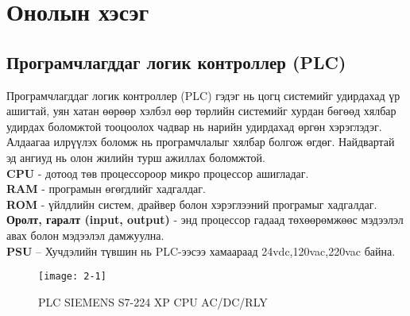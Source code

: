 
\chapter{Онолын хэсэг} %

\label{Chapter2} %
\pagecolor{white}
\section{Програмчлагддаг логик контроллер (PLC)}
Програмчлагддаг логик контроллер (PLC) гэдэг нь цогц системийг удирдахад үр ашигтай, уян хатан өөрөөр хэлбэл өөр төрлийн системийг хурдан бөгөөд хялбар удирдах боломжтой тооцоолох чадвар нь нарийн удирдахад өргөн хэрэглэдэг. Алдаагаа илрүүлэх боломж нь програмчлалыг хялбар болгож өгдөг. Найдвартай эд ангиуд нь олон жилийн турш ажиллах боломжтой.\cite{PLC} \\
\textbf{CPU} - дотоод төв процессороор микро процессор ашигладаг. \\
\textbf{RAM} - програмын өгөгдлийг хадгалдаг. \\
\textbf{ROM} - үйлдлийн систем, драйвер болон хэрэглээний програмыг хадгалдаг.\\
\textbf{Оролт, гаралт (input, output)} - энд процессор гадаад төхөөрөмжөөс мэдээлэл авах болон мэдээлэл дамжуулна. \\
\textbf{PSU} – Хучдэлийн түвшин нь PLC-ээсээ хамаараад 24vdc,120vac,220vac байна.
\begin{figure}[!ht]
	\centering
	\texttt{[image: 2-1]}
	\caption{PLC SIEMENS S7-224 XP CPU AC/DC/RLY}
	\label{fig:2-1}
\end{figure}
